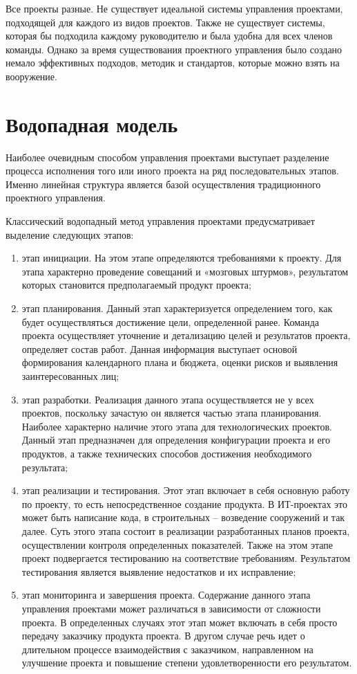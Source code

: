 \documentclass[a4paper,14pt]{extarticle}
\begin{document}
 	Все проекты разные. Не существует идеальной системы управления проектами, подходящей для каждого из видов проектов. Также не существует системы, которая бы подходила каждому руководителю и была удобна для всех членов команды. Однако за время существования проектного управления было создано немало эффективных подходов, методик и стандартов, которые можно взять на вооружение.
 	
 	\newpage
 	
 	\section{Водопадная модель}
 	
 	Наиболее очевидным способом управления проектами выступает разделение процесса исполнения того или иного проекта на ряд последовательных этапов. Именно линейная структура является базой осуществления традиционного проектного управления. 
 	
 	Классический водопадный метод управления проектами предусматривает выделение следующих этапов: 
 	\begin{enumerate}
 		\item этап инициации. На этом этапе определяются требованиями к проекту. Для этапа характерно проведение совещаний и «мозговых штурмов», результатом которых становится предполагаемый продукт проекта; 
 		\item этап планирования. Данный этап характеризуется определением того, как будет осуществляться достижение цели, определенной ранее. Команда проекта осуществляет уточнение и детализацию целей и результатов проекта, определяет состав работ. Данная информация выступает основой формирования календарного плана и бюджета, оценки рисков и выявления заинтересованных лиц; 
 		\item этап разработки. Реализация данного этапа осуществляется не у всех проектов, поскольку зачастую он является частью этапа планирования. Наиболее характерно наличие этого этапа для технологических проектов. Данный этап предназначен для определения конфигурации проекта и его продуктов, а также технических способов достижения необходимого результата; 
 		\item этап реализации и тестирования. Этот этап включает в себя основную работу по проекту, то есть непосредственное создание продукта. В ИТ-проектах это может быть написание кода, в строительных – возведение сооружений и так далее. Суть этого этапа состоит в реализации разработанных планов проекта, осуществлении контроля определенных показателей. Также на этом этапе проект подвергается тестированию на соответствие требованиям. Результатом тестирования является выявление недостатков и их исправление; 
 		\item этап мониторинга и завершения проекта. Содержание данного этапа управления проектами может различаться в зависимости от сложности проекта. В определенных случаях этот этап может включать в себя просто передачу заказчику продукта проекта. В другом случае речь идет о длительном процессе взаимодействия с заказчиком, направленном на улучшение проекта и повышение степени удовлетворенности его результатом.
 	\end{enumerate}
 
\end{document}
